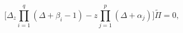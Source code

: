 \begin{equation}
\label{eq:pFqdieuf}
\biggl[
\Delta_z\prod_{i=1}^q(\Delta+\beta_i-1)-z\prod_{j=1}^p(\Delta+\alpha_j)\biggr]\tilde{\Pi}=0,
\end{equation}

